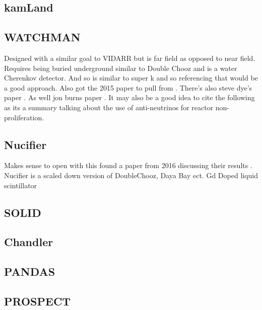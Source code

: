 \subsection{kamLand}
\subsection{WATCHMAN}
Designed with a similar goal to VIDARR but is far field as opposed to near field. Requires being buried underground similar to Double Chooz and is a water Cherenkov detector. And so is similar to super k and so referencing that would be a good approach. Also got the 2015 paper to pull from \cite{askins2015physics}. There's also steve dye's paper \cite{dye2017evaluating}. As well jon burns paper \cite{burns2018remote}. It may also be a good idea to cite the following \cite{danielson2019directionally} as its a summary talking about the use of anti-neutrinos for reactor non-proliferation.  
\subsection{Nucifier}
Makes sense to open with this found a paper from 2016 discussing their results \cite{nucifer2016}. Nucifier is a scaled down version of DoubleChooz, Daya Bay ect. Gd Doped liquid scintillator 
\subsection{SOLID}
\subsection{Chandler}
\subsection{PANDAS}
\subsection{PROSPECT}
